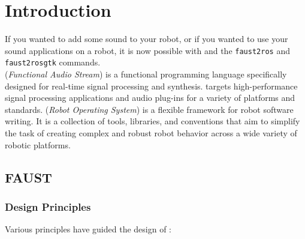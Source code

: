\chapter{Introduction}
\label{chap:intro}
If you wanted to add some sound to your robot, or if you wanted to use your sound applications 
on a robot, it is now possible with \faust and the \lstinline'faust2ros' and
\lstinline'faust2rosgtk' commands. \\
\faust (\textit{Functional Audio Stream}) is a functional programming language specifically 
designed for real-time signal processing and synthesis.  \faust targets high-performance signal 
processing applications and audio plug-ins for a variety of platforms and standards.\newline
\ros (\textit{Robot Operating System}) is a flexible framework for robot software writing. It 
is a collection of tools, libraries, and conventions that aim to simplify the task of creating 
complex and robust robot behavior across a wide variety of robotic platforms.


\section{FAUST} 
\subsection{Design Principles}

Various principles have guided the design of \faust :

